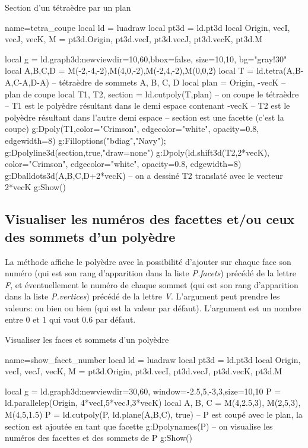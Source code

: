 \begin{demo}{Section d'un tétraèdre par un plan}
\begin{luadraw}{name=tetra_coupe}
local ld = luadraw
local pt3d = ld.pt3d
local Origin, vecI, vecJ, vecK, M = pt3d.Origin, pt3d.vecI, pt3d.vecJ, pt3d.vecK, pt3d.M

local g = ld.graph3d:new{viewdir={10,60},bbox=false, size={10,10}, bg="gray!30"}
local A,B,C,D = M(-2,-4,-2),M(4,0,-2),M(-2,4,-2),M(0,0,2)
local T = ld.tetra(A,B-A,C-A,D-A) -- tétraèdre de sommets A, B, C, D
local plan = {Origin, -vecK} -- plan de coupe
local T1, T2, section = ld.cutpoly(T,plan) -- on coupe le tétraèdre
-- T1 est le polyèdre résultant dans le demi espace contenant -vecK
-- T2 est le polyèdre résultant dans l'autre demi espace
-- section est une facette (c'est la coupe)
g:Dpoly(T1,{color="Crimson", edgecolor="white", opacity=0.8, edgewidth=8})
g:Filloptions("bdiag","Navy"); g:Dpolyline3d(section,true,"draw=none")
g:Dpoly(ld.shift3d(T2,2*vecK), {color="Crimson", edgecolor="white", opacity=0.8, edgewidth=8})
g:Dballdots3d({A,B,C,D+2*vecK}) -- on a dessiné T2 translaté avec le vecteur 2*vecK
g:Show()
\end{luadraw}
\end{demo}

\subsection{Visualiser les numéros des facettes et/ou ceux des sommets d'un polyèdre} 

La méthode  affiche le polyèdre  avec la possibilité d'ajouter sur chaque face son numéro (qui est son rang d'apparition dans la liste \emph{P.facets}) précédé de la lettre \emph{F}, et éventuellement le numéro de chaque sommet (qui est son rang d'apparition dans la liste \emph{P.vertices}) précédé de la lettre \emph{V}. L'argument  peut prendre les valeurs:  ou bien  ou bien  (qui est la valeur par défaut). L'argument  est un nombre entre $0$ et $1$ qui vaut $0.6$ par défaut.

\begin{demo}{Visualiser les faces et sommets d'un polyèdre}
\begin{luadraw}{name=show_facet_number}
local ld = luadraw
local pt3d = ld.pt3d
local Origin, vecI, vecJ, vecK, M = pt3d.Origin, pt3d.vecI, pt3d.vecJ, pt3d.vecK, pt3d.M

local g = ld.graph3d:new{viewdir={30,60}, window={-2.5,5,-3,3},size={10,10}}
P = ld.parallelep(Origin, 4*vecI,5*vecJ,3*vecK)
local A, B, C = M(4,2.5,3), M(2,5,3), M(4,5,1.5)
P = ld.cutpoly(P, ld.plane(A,B,C), true) -- P est coupé avec le plan, la section est ajoutée en tant que facette
g:Dpolynames(P) -- on visualise les numéros des facettes et des sommets de P
g:Show()
\end{luadraw}
\end{demo}


